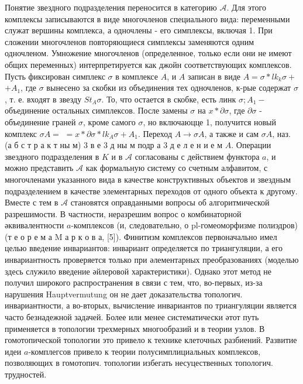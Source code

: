 \documentclass[10pt]{article}
\begin{document}
Понятие звездного подразделения переносится в категорию $\mathcal{A}$. Для этого комплексы записываются в виде многочленов специального вида: переменными служат вершины комплекса, а одночлены - его симплексы, включая 1. При сложении многочленов повторяющиеся симплексы заменяются одним одночленом. Умножение многочленов (определенное, только если они не имеют общих переменных) интерпретируется как джойн соответствующих комплексов. Пусть фиксирован симплекс $\sigma$ в комплексе $A$, и $A$ записан в виде $A=\sigma * l k_{k} \sigma+$ $+A_{1}$, где $\sigma$ вынесено за скобки из объединения тех одночленов, к-рые содержат $\sigma$, т. е. входят в звезду $S t_{A} \sigma$. То, что остается в скобке, есть линк $\sigma ; A_{1}-$ объединение остальных симплексов. После замены $\sigma$ на $x * \partial \sigma$, где $\partial \sigma$ - объединение граней $\sigma$, кроме самого $\sigma$, но включаюцце 1, получится новый комплекс $\sigma A=$ $=x * \partial \sigma * l k_{A} \sigma+A_{1}$. Переход $A \rightarrow \sigma A$, а также и сам $\sigma A$, наз. (а б с т р а к т ны м) 3 в е 3 д ны м подр а 3 д е л е н и е м $A$. Операции звездного подразделения в $K$ и в $\mathcal{A}$ согласованы с действием функтора $a$, и можно представить $\mathcal{A}$ как формальную систему со счетным алфавитом, с многочленами указанного вида в качестве конструктивных объектов и звездным подразделением в качестве элементарных переходов от одного объекта к другому. Вместе с тем в $\mathcal{A}$ становятся оправданными вопросы об алгоритмической разрешимости. В частности, неразрешим вопрос о комбинаторной әквивалентности $a$-комплексов (и, следовательно, о pl-гомеоморфизме полиэдров) (т е о р е м а M а р к о в а, [5]). Финитизм комплексов первоначально имел целью введение инвариантов: инвариант определяется по триангуляции, а его инвариантность проверяется только при әлементарных преобразованиях (моделью здесь служило введение әйлеровой характеристики). Однако этот метод не получил широкого распространения в связи с тем, что, во-первых, из-за нарушения Hauptvermutung он не дает доказательства топологич. инвариантности, а во-вторых, вычисление инвариантов по триангуляции является часто безнадежной задачей. Более или менее систематически әтот путь применяется в топологии трехмерных многообразий и в теории узлов. В гомотопической топологии это привело к технике клеточных разбиений. Развитие идеи $a$-комплегсов привело к теории полусимплициальных комплексов, позволяющих в гомотопич. топологии избегать несуцественных топологич. трудностей.
\end{document}
